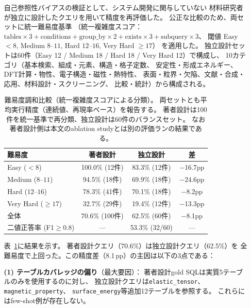 \documentclass[5p,twocolumn]{elsarticle}
\begin{document}
自己参照性バイアスの検証として、システム開発に関与していない
材料研究者が独立に設計したクエリを用いて精度を再評価した。
公正な比較のため、両セットに統一難易度基準
（統一複雑度スコア：
$\text{tables} \times 3 + \text{conditions} + \text{group\_by} \times 2
+ \text{exists} \times 3 + \text{subquery} \times 3$、
閾値 Easy $< 8$, Medium $8$--$11$, Hard $12$--$16$, Very Hard $\geq 17$）
を適用した。
独立設計セットは60件（Easy 12 / Medium 18 / Hard 18 / Very Hard 12）で構成し、
10カテゴリ（基本検索、組成・元素、構造・格子定数、
安定性・形成エネルギー、DFT計算・物性、電子構造・磁性・熱特性、
表面・粒界・欠陥、文献・合成・応用、材料設計・スクリーニング、
比較・統計）から構成される。

\begin{table}[t]
  \centering
  \caption{難易度調和比較（統一複雑度スコアによる分類）。
  両セットとも平均実行精度（連続値、再現率ベース）を報告する。
  著者設計は100件を統一基準で再分類、独立設計は60件のバランスセット。
  なお著者設計側は本文のablation studyとは別の評価ランの結果である。}
  \label{tab:independent_eval}
  \footnotesize
  \begin{tabular}{lccc}
    \toprule
    難易度 & 著者設計 & 独立設計 & 差 \\
    \midrule
    Easy ($< 8$)       & 100.0\% (12件) & 83.3\% (12件)  & $-$16.7pp \\
    Medium ($8$--$11$) &  94.5\% (18件) & 69.9\% (18件)  & $-$24.6pp \\
    Hard ($12$--$16$)  &  78.3\% (41件) & 70.1\% (18件)  & $-$8.2pp \\
    Very Hard ($\geq 17$) & 32.7\% (29件) & 19.4\% (12件) & $-$13.3pp \\
    \midrule
    全体               &  70.6\% (100件) & 62.5\% (60件) & $-$8.1pp \\
    二値正答率 (F1$\geq 0.8$) & --- & 53.3\% (32/60) & --- \\
    \bottomrule
  \end{tabular}
\end{table}

表~\ref{tab:independent_eval}に結果を示す。
著者設計クエリ（70.6\%）は独立設計クエリ（62.5\%）を
全難易度で上回った。この精度差（8.1\,pp）の主因は以下の3点である：

\textbf{(1) テーブルカバレッジの偏り}（最大要因）：
著者設計gold SQLは実質5テーブルのみを使用するのに対し、
独立設計クエリは\texttt{elastic\_tensor}、\texttt{magnetic\_property}、
\texttt{surface\_energy}等追加12テーブルを参照する。
これらにはfew-shot例が存在しない。
\end{document}
